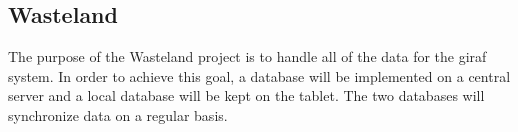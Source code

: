 \subsection{Wasteland}
\label{sub:wasteland}
The purpose of the Wasteland project is to handle all of the data for the \ac{giraf} system. In order to achieve this goal, a database will be implemented on a central server and a local database will be kept on the tablet. The two databases will synchronize data on a regular basis.